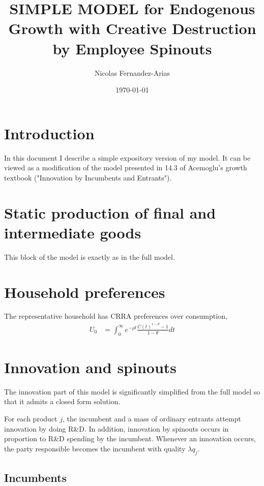 \documentclass[12pt,english]{article}
\theoremstyle{remark}
\begin{document}
	
\title{SIMPLE MODEL for Endogenous Growth with Creative Destruction by Employee Spinouts}
\author{Nicolas Fernandez-Arias}
\date{\today}
\maketitle

\section{Introduction}

In this document I describe a simple expository version of my model.  It can be viewed as a modification of the model presented in 14.3 of Acemoglu's growth textbook ("Innovation by Incumbents and Entrants").

\section{Static production of final and intermediate goods}

This block of the model is exactly as in the full model. 

\section{Household preferences}

The representative household has CRRA preferences over consumption, 
\begin{align}
	U_0 &= \int_0^{\infty} e^{-\rho t} \frac{C(t)^{1-\theta} - 1}{1-\theta} dt \label{preferences}
\end{align}

\section{Innovation and spinouts}

The innovation part of this model is significantly simplified from the full model so that it admits a closed form solution. 

For each product $j$, the incumbent and a mass of ordinary entrants attempt innovation by doing R\&D. In addition, innovation by spinouts occurs in proportion to R\&D spending by the incumbent. Whenever an innovation occurs, the party responsible becomes the incumbent with quality $\lambda q_j$. 

\subsection{Incumbents}
\end{document}
